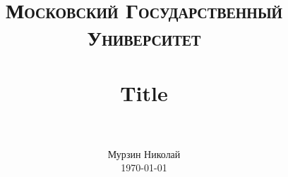 \title{
  \vspace{-1in}
  \normalfont \normalsize \textsc{Московский Государственный Университет} \\ [25pt]
  \horrule{0.5pt} \\[0.4cm]
  \huge Title \\
  \horrule{2pt} \\[0.5cm]
}
\author{
  \normalfont
  \normalsize
  {Мурзин Николай}\\[-3pt]  
  \normalsize
  \today
}
\date{}